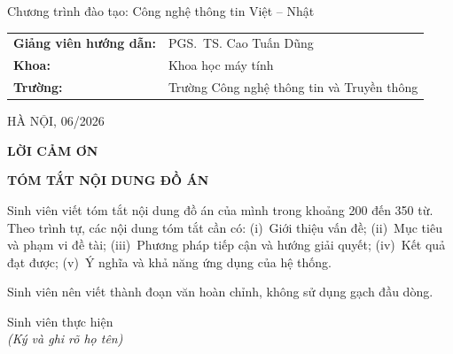 ﻿\documentclass[a4paper,12pt,openany,oneside]{report}
\begin{document}
\begin{titlepage}
    {\fontsize{13pt}{16pt}\selectfont
        Chương trình đào tạo: Công nghệ thông tin Việt -- Nhật\par}

    \vspace{1.0cm}

    \begin{flushleft}
        \fontsize{12pt}{15pt}\selectfont
        \begin{tabular}{p{5.7cm}p{8.5cm}}
            \textbf{Giảng viên hướng dẫn:} & PGS.~TS. Cao Tuấn Dũng \\[4pt]
            \textbf{Khoa:}                  & Khoa học máy tính \\[4pt]
            \textbf{Trường:}                & Trường Công nghệ thông tin và Truyền thông \\
        \end{tabular}
    \end{flushleft}

    \vfill

    {\fontsize{13pt}{16pt}\selectfont
        HÀ NỘI, 06/2026\par}

\end{titlepage}

\clearpage
\thispagestyle{empty}
\begin{center}
    {\bfseries\fontsize{18pt}{22pt}\selectfont LỜI CẢM ƠN}
\end{center}
\vspace{1.5cm}


\clearpage
\thispagestyle{empty}
\begin{center}
    {\bfseries\fontsize{18pt}{22pt}\selectfont TÓM TẮT NỘI DUNG ĐỒ ÁN}
\end{center}
\vspace{1.5cm}

Sinh viên viết tóm tắt nội dung đồ án của mình trong khoảng 200 đến 350 từ.
Theo trình tự, các nội dung tóm tắt cần có:
(i)~Giới thiệu vấn đề;
(ii)~Mục tiêu và phạm vi đề tài;
(iii)~Phương pháp tiếp cận và hướng giải quyết;
(iv)~Kết quả đạt được;
(v)~Ý nghĩa và khả năng ứng dụng của hệ thống.

Sinh viên nên viết thành đoạn văn hoàn chỉnh, không sử dụng gạch đầu dòng.

\vspace{2cm}
\begin{flushright}
    Sinh viên thực hiện\\[4pt]
    {\itshape (Ký và ghi rõ họ tên)}
\end{flushright}
\end{document}

